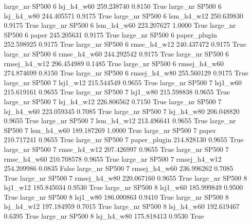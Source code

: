   large_nr    SP500                 6   lsj_h4_w60  259.238740      0.8150    True
  large_nr    SP500                 6   lsj_h4_w80  244.405571      0.9175    True
  large_nr    SP500                 6   lsm_h4_w12  250.639830      0.9175    True
  large_nr    SP500                 6   lsm_h4_w60  223.207627      1.0000    True
  large_nr    SP500                 6        paper  245.205631      0.9175    True
  large_nr    SP500                 6 paper_plugin  252.598925      0.9175    True
  large_nr    SP500                 6  rmse_h4_w12  240.437472      0.9175    True
  large_nr    SP500                 6  rmse_h4_w60  244.292542      0.9175    True
  large_nr    SP500                 6 rmsej_h4_w12  296.454989      0.1485    True
  large_nr    SP500                 6 rmsej_h4_w60  274.874699      0.8150    True
  large_nr    SP500                 6 rmsej_h4_w80  255.560129      0.9175    True
  large_nr    SP500                 7     lsj1_w12  215.544549      0.9655    True
  large_nr    SP500                 7     lsj1_w60  215.619161      0.9655    True
  large_nr    SP500                 7     lsj1_w80  215.598838      0.9655    True
  large_nr    SP500                 7   lsj_h4_w12  226.806562      0.7150    True
  large_nr    SP500                 7   lsj_h4_w60  223.059345      0.7085    True
  large_nr    SP500                 7   lsj_h4_w80  206.048820      0.9655    True
  large_nr    SP500                 7   lsm_h4_w12  213.496641      0.9655    True
  large_nr    SP500                 7   lsm_h4_w60  189.187269      1.0000    True
  large_nr    SP500                 7        paper  210.717241      0.9655    True
  large_nr    SP500                 7 paper_plugin  214.828130      0.9655    True
  large_nr    SP500                 7  rmse_h4_w12  207.426997      0.9655    True
  large_nr    SP500                 7  rmse_h4_w60  210.708578      0.9655    True
  large_nr    SP500                 7 rmsej_h4_w12  254.209986      0.0835   False
  large_nr    SP500                 7 rmsej_h4_w60  236.996262      0.7085    True
  large_nr    SP500                 7 rmsej_h4_w80  220.067160      0.9655    True
  large_nr    SP500                 8     lsj1_w12  185.845034      0.9530    True
  large_nr    SP500                 8     lsj1_w60  185.999849      0.9500    True
  large_nr    SP500                 8     lsj1_w80  186.000863      0.9410    True
  large_nr    SP500                 8   lsj_h4_w12  197.184959      0.7015    True
  large_nr    SP500                 8   lsj_h4_w60  192.619467      0.6395    True
  large_nr    SP500                 8   lsj_h4_w80  175.818413      0.9530    True
